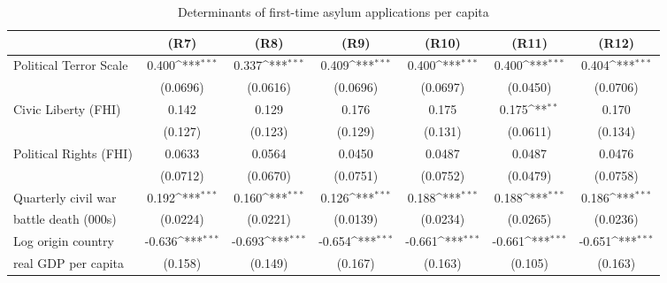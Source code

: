 \begin{table}[htbp]\centering \scriptsize
\def\sym#1{\ifmmode^{#1}\else\(^{#1}\)\fi}
\caption{Determinants of first-time asylum applications per capita}
\begin{tabular}{l*{6}{c}}
\hline\hline
                    &\multicolumn{1}{c}{(R7)}         &\multicolumn{1}{c}{(R8)}         &\multicolumn{1}{c}{(R9)}         &\multicolumn{1}{c}{(R10)}         &\multicolumn{1}{c}{(R11)}         &\multicolumn{1}{c}{(R12)}         \\
\hline
Political Terror Scale	&       0.400\sym{***}& 0.337\sym{***}    &       0.409\sym{***}&       0.400\sym{***}&       0.400\sym{***}&       0.404\sym{***}\\
                    	&    (0.0696)         &     (0.0616)                  &    (0.0696)         &    (0.0697)         &    (0.0450)         &    (0.0706)         \\
[0,5em]
Civic Liberty (FHI) 	&       0.142         &        0.129              &       0.176         &       0.175         &       0.175\sym{**} &       0.170         \\
                    	&     (0.127)         &        (0.123)             &     (0.129)         &     (0.131)         &    (0.0611)         &     (0.134)         \\
[0,5em]
Political Rights (FHI)	&      0.0633         &       0.0564                &      0.0450         &      0.0487         &      0.0487         &      0.0476         \\
                    	&    (0.0712)         &          (0.0670)           &    (0.0751)         &    (0.0752)         &    (0.0479)         &    (0.0758)         \\
[0,5em]
Quarterly civil war 	&       0.192\sym{***}&     0.160\sym{***}          &    0.126\sym{***}                 &       0.188\sym{***}&       0.188\sym{***}&       0.186\sym{***}\\
battle death (000s)     &    (0.0224)         &  (0.0221)                   &     (0.0139)                 &    (0.0234)         &    (0.0265)         &    (0.0236)         \\
[0,5em]
Log origin country 		&      -0.636\sym{***}&   -0.693\sym{***}                  &      -0.654\sym{***}&      -0.661\sym{***}&      -0.661\sym{***}&      -0.651\sym{***}\\
real GDP per capita     &     (0.158)         &     (0.149)                 &     (0.167)         &     (0.163)         &     (0.105)         &     (0.163)         \\

\end{tabular}
\end{table}
